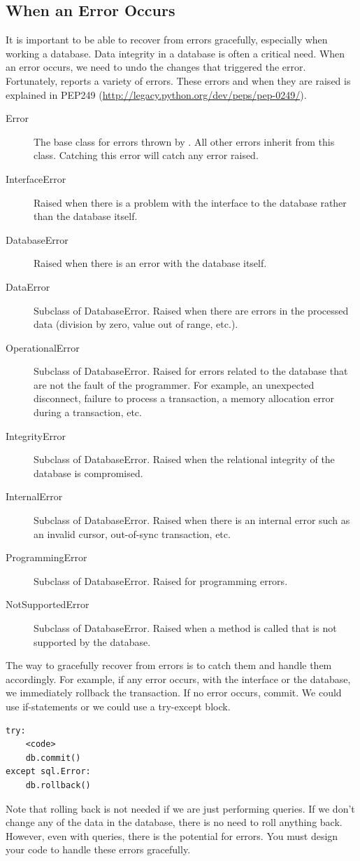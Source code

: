 \subsection*{When an Error Occurs}
It is important to be able to recover from errors gracefully, especially when working a database.
Data integrity in a database is often a critical need.
When an error occurs, we need to undo the changes that triggered the error.
Fortunately,  reports a variety of errors.
These errors and when they are raised is explained in PEP249 (\url{http://legacy.python.org/dev/peps/pep-0249/}).
\begin{description}
\item[Error] The base class for errors thrown by .  All other errors inherit from this class.  Catching this error will catch any error raised.
\item[InterfaceError] Raised when there is a problem with the interface to the database rather than the database itself.
\item[DatabaseError] Raised when there is an error with the database itself.
\item[DataError] Subclass of DatabaseError.  Raised when there are errors in the processed data (division by zero, value out of range, etc.).
\item[OperationalError] Subclass of DatabaseError. Raised for errors related to the database that are not the fault of the programmer.  For example, an unexpected disconnect, failure to process a transaction, a memory allocation error during a transaction, etc.
\item[IntegrityError] Subclass of DatabaseError.  Raised when the relational integrity of the database is compromised.
\item[InternalError] Subclass of DatabaseError. Raised when there is an internal error such as an invalid cursor, out-of-sync transaction, etc.
\item[ProgrammingError] Subclass of DatabaseError.  Raised for programming errors.
\item[NotSupportedError] Subclass of DatabaseError.  Raised when a method is called that is not supported by the database.
\end{description}

The way to gracefully recover from errors is to catch them and handle them accordingly.  For example, if any error occurs, with the interface or the database, we immediately rollback the transaction.  If no error occurs, commit.  We could use if-statements or we could use a try-except block.
\begin{lstlisting}
try:
    <code>
    db.commit()
except sql.Error:
    db.rollback()
\end{lstlisting}
Note that rolling back is not needed if we are just performing queries.
If we don't change any of the data in the database, there is no need to roll anything back.  However, even with queries, there is the potential for errors.  You must design your code to handle these errors gracefully.

\let\undefined\lsql 
